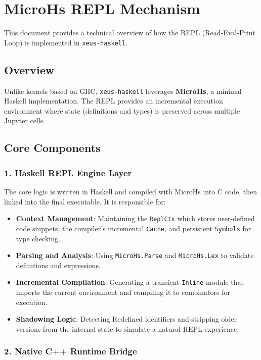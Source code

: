 \section{MicroHs REPL Mechanism}


This document provides a technical overview of how the REPL (Read-Eval-Print Loop) is implemented in \texttt{xeus-haskell}.
\subsection{Overview}


Unlike kernels based on GHC, \texttt{xeus-haskell} leverages \textbf{MicroHs}, a minimal Haskell implementation. The REPL provides an incremental execution environment where state (definitions and types) is preserved across multiple Jupyter cells.
\subsection{Core Components}


\subsubsection{1. Haskell REPL Engine Layer}


The core logic is written in Haskell and compiled with MicroHs into C code, then linked into the final executable. It is responsible for:
\begin{itemize}
\item \textbf{Context Management}: Maintaining the \texttt{ReplCtx} which stores user-defined code snippets, the compiler's incremental \texttt{Cache}, and persistent \texttt{Symbols} for type checking.
\item \textbf{Parsing and Analysis}: Using \texttt{MicroHs.Parse} and \texttt{MicroHs.Lex} to validate definitions and expressions.
\item \textbf{Incremental Compilation}: Generating a transient \texttt{Inline} module that imports the current environment and compiling it to combinators for execution.
\item \textbf{Shadowing Logic}: Detecting Redefined identifiers and stripping older versions from the internal state to simulate a natural REPL experience.
\end{itemize}


\subsubsection{2. Native C++ Runtime Bridge}


